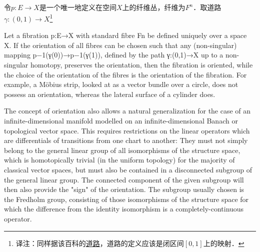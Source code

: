 



令$p: E\to X$是一个唯一地定义在空间$X$上的纤维丛，纤维为$F^n$．取道路$\gamma: (0, 1)\to X$\footnote{译注：同样据该百科的\href{https://encyclopediaofmath.org/wiki/Path}{道路}，道路的定义应该是闭区间$[0, 1]$上的映射．}




Let a fibration p:E→X with standard fibre Fn be defined uniquely over a space X. If the orientation of all fibres can be chosen such that any (non-singular) mapping p−1(γ(0))→p−1(γ(1)), defined by the path γ:(0,1)→X up to a non-singular homotopy, preserves the orientation, then the fibration is oriented, while the choice of the orientation of the fibres is the orientation of the fibration. For example, a Möbius strip, looked at as a vector bundle over a circle, does not possess an orientation, whereas the lateral surface of a cylinder does.

The concept of orientation also allows a natural generalization for the case of an infinite-dimensional manifold modelled on an infinite-dimensional Banach or topological vector space. This requires restrictions on the linear operators which are differentials of transitions from one chart to another: They must not simply belong to the general linear group of all isomorphisms of the structure space, which is homotopically trivial (in the uniform topology) for the majority of classical vector spaces, but must also be contained in a disconnected subgroup of the general linear group. The connected component of the given subgroup will then also provide the "sign" of the orientation. The subgroup usually chosen is the Fredholm group, consisting of those isomorphisms of the structure space for which the difference from the identity isomorphism is a completely-continuous operator.


















